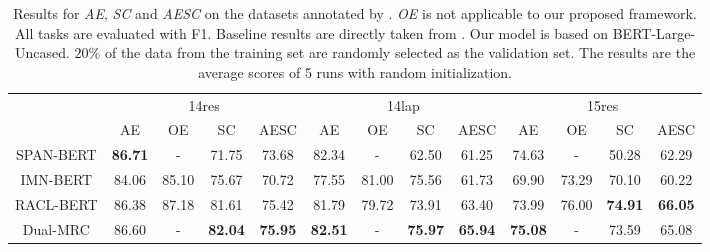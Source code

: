 \documentclass[letterpaper]{article} \usepackage{aaai21}  \usepackage{times}  \usepackage{helvet} \usepackage{courier}  \usepackage[hyphens]{url}  \usepackage{graphicx} \urlstyle{rm} \def\UrlFont{\rm}  \usepackage{natbib}  \usepackage{caption}
\begin{document}
\begin{table*}
    \centering
    \begin{tabular}{c|cccc|cccc|cccc}
    \hline
             & \multicolumn{4}{c|}{14res}         & \multicolumn{4}{c|}{14lap}         & \multicolumn{4}{c}{15res}          \\ \cline{2-13} 
             & AE    & OE    & SC    & AESC       & AE    & OE    & SC    & AESC       & AE    & OE    & SC    & AESC       \\ \hline
    SPAN-BERT    & \textbf{86.71} & -     & 71.75 & 73.68      & 82.34 & -     & 62.50 & 61.25      & 74.63 & -     & 50.28 & 62.29      \\
    IMN-BERT      & 84.06 & 85.10 & 75.67 & 70.72      & 77.55 & 81.00 & 75.56 & 61.73      & 69.90 & 73.29 & 70.10 & 60.22      \\
    RACL-BERT     & 86.38 & 87.18 & 81.61 & 75.42      & 81.79 & 79.72 & 73.91 & 63.40      & 73.99 & 76.00 & \textbf{74.91} & \textbf{66.05}      \\ \hline
    Dual-MRC & 86.60 & -     & \textbf{82.04}     & \textbf{75.95} & \textbf{82.51}     & -     & \textbf{75.97}     & \textbf{65.94} & \textbf{75.08}     & -     & 73.59    & 65.08 \\ \hline
    \end{tabular} 
    \caption{Results for \emph{AE}, \emph{SC} and \emph{AESC} on the datasets annotated by \cite{DBLP:conf/aaai/WangPDX17}. 
    \emph{OE} is not applicable to our proposed framework. All tasks are evaluated with F1. 
    Baseline results are directly taken from \cite{chen-qian-2020-relation}. Our model is based on BERT-Large-Uncased. 
    $20\%$ of the data from the training set are randomly selected as the validation set. The results are the average scores of 5 runs with random initialization.}
    \label{exp_1}
\end{table*} 
\end{document}
